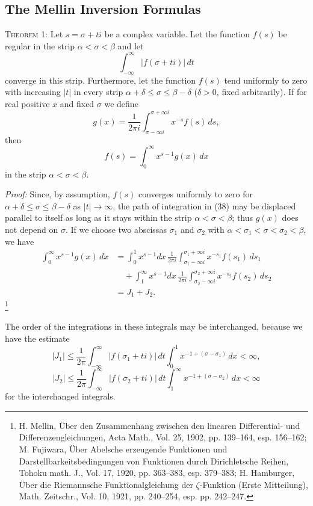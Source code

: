 \subsection{The Mellin Inversion Formulas}
\textsc{Theorem 1:} Let $s=\sigma+ti$ be a complex variable. Let the function $f(s)$ be regular in the strip $\alpha<\sigma<\beta$ and let
\[
\int_{-\infty}^{\infty}|f(\sigma+ti)|\,dt
\]
converge in this strip. Furthermore, let the function $f(s)$ tend uniformly to zero with increasing $|t|$ in every strip $\alpha+\delta\le\sigma\le\beta-\delta$ ($\delta>0$, fixed arbitrarily). If for real positive $x$ and fixed $\sigma$ we define
\begin{equation}
g(x)=\frac{1}{2\pi i}\int_{\sigma-\infty i}^{\sigma+\infty i}x^{-s}f(s)\,ds,
\tag{38}
\end{equation}
then
\begin{equation}
f(s)=\int_0^\infty x^{s-1}g(x)\,dx
\tag{39}
\end{equation}
in the strip $\alpha<\sigma<\beta$.

\emph{Proof:} Since, by assumption, $f(s)$ converges uniformly to zero for $\alpha+\delta\le\sigma\le\beta-\delta$ as $|t|\to\infty$, the path of integration in (38) may be displaced parallel to itself as long as it stays within the strip $\alpha<\sigma<\beta$; thus $g(x)$ does not depend on $\sigma$. If we choose two abscissas $\sigma_1$ and $\sigma_2$ with $\alpha<\sigma_1<\sigma<\sigma_2<\beta$, we have
\[
\begin{aligned}
\int_0^\infty x^{s-1}g(x)\,dx
&=\int_0^1x^{s-1}dx\,\frac{1}{2\pi i}
\int_{\sigma_1-\infty i}^{\sigma_1+\infty i}x^{-s_1}f(s_1)\,ds_1\\
&\quad+\int_1^\infty x^{s-1}dx\,\frac{1}{2\pi i}
\int_{\sigma_2-\infty i}^{\sigma_2+\infty i}x^{-s_2}f(s_2)\,ds_2\\
&=J_1+J_2.
\end{aligned}
\]
\footnote{H. Mellin, \"Uber den Zusammenhang zwischen den linearen Differential- und Differenzengleichungen, Acta Math., Vol. 25, 1902, pp. 139--164, esp. 156--162; M. Fujiwara, \"Uber Abelsche erzeugende Funktionen und Darstellbarkeitsbedingungen von Funktionen durch Dirichletsche Reihen, Tohoku math. J., Vol. 17, 1920, pp. 363--383, esp. 379--383; H. Hamburger, \"Uber die Riemannsche Funktionalgleichung der $\zeta$-Funktion (Erste Mitteilung), Math. Zeitschr., Vol. 10, 1921, pp. 240--254, esp. pp. 242--247.}

The order of the integrations in these integrals may be interchanged, because we have the estimate
\[
|J_1|\le\frac{1}{2\pi}\int_{-\infty}^{\infty}|f(\sigma_1+ti)|\,dt
\int_0^1x^{-1+(\sigma-\sigma_1)}\,dx<\infty,
\]
\[
|J_2|\le\frac{1}{2\pi}\int_{-\infty}^{\infty}|f(\sigma_2+ti)|\,dt
\int_1^\infty x^{-1+(\sigma-\sigma_2)}\,dx<\infty
\]
for the interchanged integrals.

